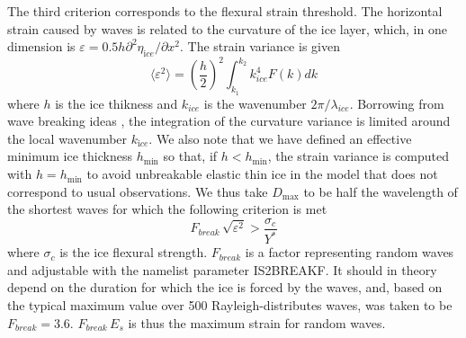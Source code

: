 \noindent
The third criterion corresponds to the flexural strain threshold. The horizontal 
strain caused by waves is related to 
the curvature of the ice layer, which, in one dimension is 
$\varepsilon = 0.5 h \partial ^2 \eta_{\mathrm ice} / \partial x^2$. 
The strain variance is given 
\begin{equation}
\langle\varepsilon^2\rangle = \left( \frac{h}{2} \right) ^2   \int_{k_1}^{k_2} k_{ice}^4 F(k)dk 
\label{strain_sign}
\end{equation}
where $h$ is the ice thikness and $k_{ice}$ is the wavenumber $2 \pi /\lambda_{ice}$. 
Borrowing from wave breaking 
ideas \citep{art:BBY00}, the integration of the curvature variance is limited around 
the local wavenumber $k_{\mathrm ice}$. 
We also note that we have defined an effective minimum ice thickness $h_{\min}$ so that, 
if $h<h_{\min}$, the strain 
variance is computed with $h=h_{\min}$ to avoid unbreakable elastic thin ice in the model 
that does not correspond to 
usual observations. We thus take $D_{\max}$ to be half the wavelength of the shortest 
waves for which the following criterion is met 
\begin{equation}
F_{break}\, \sqrt{\varepsilon^2} > \frac{\sigma_c}{Y^*} 
\label{strain_crit}
\end{equation}
where $\sigma_c$ is the ice flexural strength. $F_{break}$ is a factor representing random waves and adjustable with 
the namelist parameter  {\code IS2BREAKF}. It should in theory depend on the duration for which the ice is forced by the 
waves, and, based on the typical maximum value over 500 Rayleigh-distributes waves, was taken to be $F_{break}=3.6$. 
$F_{break} \, E_s$ is thus the maximum strain for random waves. \\ 



